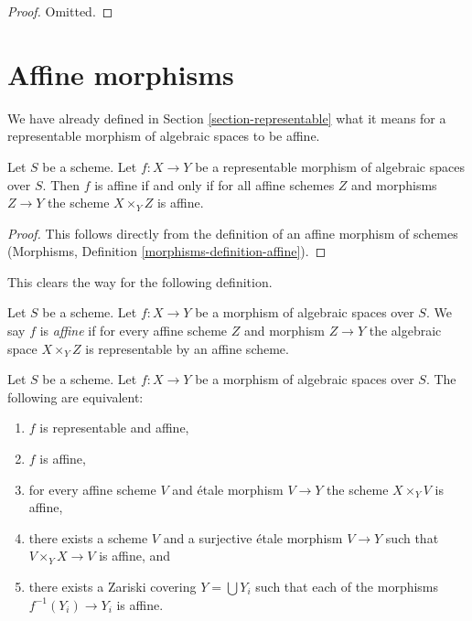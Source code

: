 \begin{proof}
Omitted.
\end{proof}











\section{Affine morphisms}
\label{section-affine}

\noindent
We have already defined in Section \ref{section-representable}
what it means for a representable morphism of algebraic spaces
to be affine.

\begin{lemma}
\label{lemma-affine-representable}
Let $S$ be a scheme. Let $f : X \to Y$ be a representable
morphism of algebraic spaces over $S$. Then
$f$ is affine if and only if for all affine schemes $Z$
and morphisms $Z \to Y$ the scheme $X \times_Y Z$ is affine.
\end{lemma}

\begin{proof}
This follows directly from the definition of an affine morphism of schemes
(Morphisms, Definition \ref{morphisms-definition-affine}).
\end{proof}

\noindent
This clears the way for the following definition.

\begin{definition}
\label{definition-affine}
Let $S$ be a scheme.
Let $f : X \to Y$ be a morphism of algebraic spaces over $S$.
We say $f$ is {\it affine} if for every affine scheme $Z$ and
morphism $Z \to Y$ the algebraic space $X \times_Y Z$ is representable
by an affine scheme.
\end{definition}

\begin{lemma}
\label{lemma-affine-local}
Let $S$ be a scheme.
Let $f : X \to Y$ be a morphism of algebraic spaces over $S$.
The following are equivalent:
\begin{enumerate}
\item $f$ is representable and affine,
\item $f$ is affine,
\item for every affine scheme $V$ and \'etale morphism $V \to Y$
the scheme $X \times_Y V$ is affine,
\item there exists a scheme $V$ and a surjective \'etale morphism
$V \to Y$ such that $V \times_Y X \to V$ is affine, and
\item there exists a Zariski covering $Y = \bigcup Y_i$ such
that each of the morphisms $f^{-1}(Y_i) \to Y_i$ is affine.
\end{enumerate}
\end{lemma}

